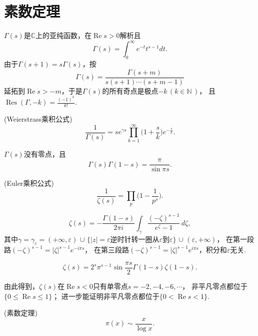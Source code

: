 \section{素数定理}

\begin{definition}$\Gamma(s)$是$\mathbb{C}$上的亚纯函数，在$\operatorname{Re}s>0$解析且
$$\Gamma(s)=\int_0^\infty e^{-t}t^{s-1}dt.$$
由于$\Gamma(s+1)=s\Gamma(s)$，按$$\Gamma(s)=\frac{\Gamma(s+m)}{s(s+1)\cdots(s+m-1)}$$
延拓到$\operatorname{Re}s>-m$，于是$\Gamma(s)$的所有奇点是极点$-k\,(k\in\mathbb{N}\,)$，
且$\operatorname{Res}(\Gamma,-k)=\frac{(-1)^k}{k!}$.\end{definition}

\begin{proposition}(Weierstrass乘积公式) $$\frac{1}{\Gamma(s)}=se^{\gamma s}
\overset{\infty}{\prod\limits_{k=1}}\Big(1+\frac{s}{k}\Big)e^{-\frac{s}{k}}.$$\end{proposition}

\begin{corollary}$\Gamma(s)$没有零点，且$$\Gamma(s)\Gamma(1-s)=\frac{\pi}{\sin\pi s}.$$\end{corollary}

\begin{proposition}(Euler乘积公式) $$\frac{1}{\zeta(s)}=\prod\limits_p\Big(1-\frac{1}{p^s}\Big).$$\end{proposition}

\begin{definition}$$\zeta(s)=-\frac{\Gamma(1-s)}{2\pi i}
\int_\gamma\frac{(-\zeta)^{s-1}}{e^\zeta-1}\,d\zeta,$$
其中$\gamma=\gamma_\varepsilon=(+\infty,\varepsilon)$ $\cup$ 
$\{|z|=\varepsilon$逆时针转一圈从$\varepsilon$到$\varepsilon\}$ $\cup$ $(\varepsilon,+\infty)$，
在第一段路$(-\zeta)^{s-1}=|\zeta|^{s-1}e^{-i\pi s}$，
在第三段路$(-\zeta)^{s-1}=|\zeta|^{s-1}e^{i\pi s}$，积分和$\varepsilon$无关.\end{definition}

\begin{proposition}$$\zeta(s)=2^s\pi^{s-1}\sin\frac{\pi s}{2}\Gamma(1-s)\zeta(1-s).$$\end{proposition}

\begin{corollary}由此得到，$\zeta(s)$在$\operatorname{Re}s<0$只有单零点$s=-2,-4,-6,\cdots$，
非平凡零点都位于$\{0\leq\operatorname{Re}s\leq1\}$；
进一步能证明非平凡零点都位于$\{0<\operatorname{Re}s<1\}$.\end{corollary}

\begin{proposition}(素数定理) $$\pi(x)\sim\frac{x}{\log x}.$$\end{proposition}

